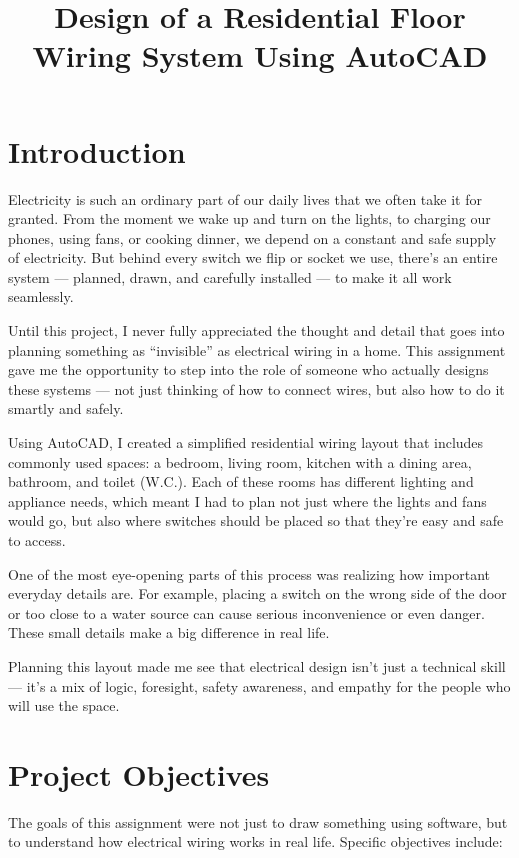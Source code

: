 \documentclass[12pt]{article}
\title{\textbf{Design of a Residential Floor Wiring System Using AutoCAD}}
\author{}
\date{}
\begin{document}
\maketitle

\section*{Introduction}
Electricity is such an ordinary part of our daily lives that we often take it for granted. From the moment we wake up and turn on the lights, to charging our phones, using fans, or cooking dinner, we depend on a constant and safe supply of electricity. But behind every switch we flip or socket we use, there’s an entire system — planned, drawn, and carefully installed — to make it all work seamlessly.

Until this project, I never fully appreciated the thought and detail that goes into planning something as “invisible” as electrical wiring in a home. This assignment gave me the opportunity to step into the role of someone who actually designs these systems — not just thinking of how to connect wires, but also how to do it smartly and safely.

Using AutoCAD, I created a simplified residential wiring layout that includes commonly used spaces: a bedroom, living room, kitchen with a dining area, bathroom, and toilet (W.C.). Each of these rooms has different lighting and appliance needs, which meant I had to plan not just where the lights and fans would go, but also where switches should be placed so that they’re easy and safe to access.

One of the most eye-opening parts of this process was realizing how important everyday details are. For example, placing a switch on the wrong side of the door or too close to a water source can cause serious inconvenience or even danger. These small details make a big difference in real life.

Planning this layout made me see that electrical design isn’t just a technical skill — it’s a mix of logic, foresight, safety awareness, and empathy for the people who will use the space.
\newpage


\section*{Project Objectives}
The goals of this assignment were not just to draw something using software, but to understand how electrical wiring works in real life. Specific objectives include:
\end{document}
